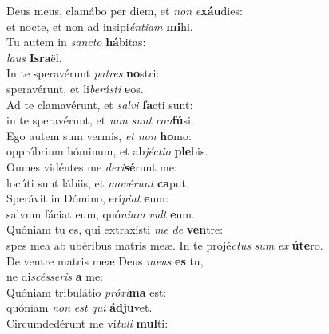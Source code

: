 \evenverse Deus meus, clamábo per diem, et \textit{non} \textit{e}\textbf{xáu}dies:~\*\\
\evenverse et nocte, et non ad insipi\textit{én}\textit{ti}\textit{am} \textbf{mi}hi.\\
\oddverse Tu autem in \textit{san}\textit{cto} \textbf{há}bitas:~\*\\
\oddverse \textit{laus} \textbf{Is}\textbf{ra}ël.\\
\evenverse In te speravérunt \textit{pa}\textit{tres} \textbf{no}stri:~\*\\
\evenverse speravérunt, et li\textit{be}\textit{rá}\textit{sti} \textbf{e}os.\\
\oddverse Ad te clamavérunt, et \textit{sal}\textit{vi} \textbf{fa}cti sunt:~\*\\
\oddverse in te speravérunt, et \textit{non} \textit{sunt} \textit{con}\textbf{fú}si.\\
\evenverse Ego autem sum vermis, \textit{et} \textit{non} \textbf{ho}mo:~\*\\
\evenverse oppróbrium hóminum, et ab\textit{jé}\textit{cti}\textit{o} \textbf{ple}bis.\\
\oddverse Omnes vidéntes me \textit{de}\textit{ri}\textbf{sé}runt me:~\*\\
\oddverse locúti sunt lábiis, et \textit{mo}\textit{vé}\textit{runt} \textbf{ca}put.\\
\evenverse Sperávit in Dómino, erí\textit{pi}\textit{at} \textbf{e}um:~\*\\
\evenverse salvum fáciat eum, quó\textit{ni}\textit{am} \textit{vult} \textbf{e}um.\\
\oddverse Quóniam tu es, qui extraxísti \textit{me} \textit{de} \textbf{ven}tre:~\*\\
\oddverse spes mea ab ubéribus matris meæ. In te projé\textit{ctus} \textit{sum} \textit{ex} \textbf{ú}\textbf{te}ro.\\
\evenverse De ventre matris meæ Deus \textit{me}\textit{us} \textbf{es} tu,~\*\\
\evenverse ne di\textit{scés}\textit{se}\textit{ris} \textbf{a} me:\\
\oddverse Quóniam tribulátio \textit{pró}\textit{xi}\textbf{ma} est:~\*\\
\oddverse quóniam \textit{non} \textit{est} \textit{qui} \textbf{ád}\textbf{ju}vet.\\
\evenverse Circumdedérunt me ví\textit{tu}\textit{li} \textbf{mul}ti:~\*\\
